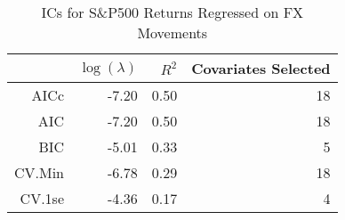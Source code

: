 \begin{table}[ht]
\centering
\begin{tabular}{rrrr}
  \hline
 & $\log(\lambda)$ & $R^2$ & Covariates Selected \\ 
  \hline
AICc & -7.20 & 0.50 &  18 \\ 
  AIC & -7.20 & 0.50 &  18 \\ 
  BIC & -5.01 & 0.33 &   5 \\ 
  CV.Min & -6.78 & 0.29 &  18 \\ 
  CV.1se & -4.36 & 0.17 &   4 \\ 
   \hline
\end{tabular}
\caption{ICs for S\&P500 Returns Regressed on FX Movements} 
\label{tab:spregfx_ics}
\end{table}
